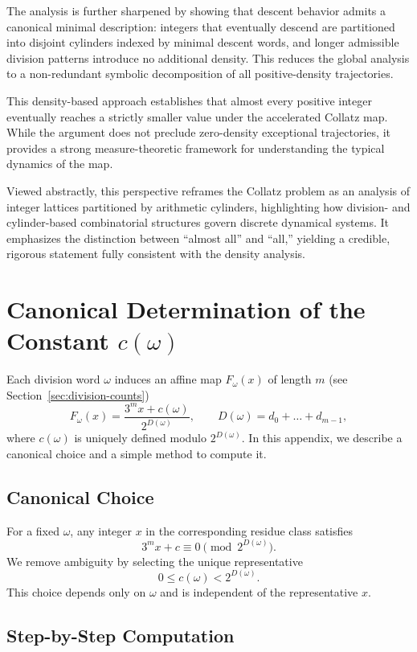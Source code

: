 \documentclass[12pt, oneside]{article}   	%
\numberwithin{equation}{section}          %
\theoremstyle{definition}
\begin{document}
The analysis is further sharpened by showing that descent behavior admits a canonical
minimal description: integers that eventually descend are partitioned into disjoint
cylinders indexed by minimal descent words, and longer admissible division patterns
introduce no additional density. This reduces the global analysis to a non-redundant
symbolic decomposition of all positive-density trajectories.

This density-based approach establishes that almost every positive integer eventually
reaches a strictly smaller value under the accelerated Collatz map. While the argument
does not preclude zero-density exceptional trajectories, it provides a strong
measure-theoretic framework for understanding the typical dynamics of the map.

Viewed abstractly, this perspective reframes the Collatz problem as an analysis of
integer lattices partitioned by arithmetic cylinders, highlighting how division-
and cylinder-based combinatorial structures govern discrete dynamical systems. It
emphasizes the distinction between “almost all” and “all,” yielding a credible,
rigorous statement fully consistent with the density analysis.


\newpage
\appendix
\section{Canonical Determination of the Constant \(c(\omega)\)}
\label{app:canonical-c}

Each division word \(\omega\) induces an affine map \(F_\omega(x)\) of length $m$
(see Section~\ref{sec:division-counts})
\[
F_\omega(x) = \frac{3^m x + c(\omega)}{2^{D(\omega)}}, \qquad D(\omega) = d_0 + \dots + d_{m-1},
\]
where \(c(\omega)\) is uniquely defined modulo \(2^{D(\omega)}\). In this appendix,
we describe a canonical choice and a simple method to compute it.

\subsection{Canonical Choice}

For a fixed \(\omega\), any integer \(x\) in the corresponding residue class satisfies
\[
3^m x + c \equiv 0 \pmod{2^{D(\omega)}}.
\]
We remove ambiguity by selecting the unique representative
\[
0 \le c(\omega) < 2^{D(\omega)}.
\]
This choice depends only on \(\omega\) and is independent of the representative \(x\).

\subsection{Step-by-Step Computation}
\end{document}
